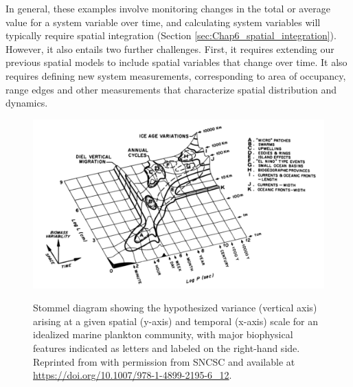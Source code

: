 In general, these examples involve monitoring changes in the total or average value for a system variable over time, and calculating system variables will typically require spatial integration (Section \ref{sec:Chap6_spatial_integration}).  However, it also entails two further challenges.  First, it requires extending our previous spatial models to include spatial variables that change over time.  It also requires defining new system measurements, corresponding to area of occupancy, range edges and other measurements that characterize spatial distribution and dynamics.

\begin{figure}[!ht]
    \caption[Stommel diagram showing variance for spatial and temporal scales]{Stommel diagram showing the hypothesized variance (vertical axis) arising at a given spatial (y-axis) and temporal (x-axis) scale for an idealized marine plankton community, with major biophysical features indicated as letters and labeled on the right-hand side.  Reprinted from \cite{haury_patterns_1978} with permission from SNCSC and available at \url{https://doi.org/10.1007/978-1-4899-2195-6_12}.}
    \centering
    \includegraphics[width=5.5in]{Chap_8/Haury McGowan Wiebe 1978 Fig-1.PNG}
    \label{fig:Chap8_stommel_diagram}
\end{figure}

